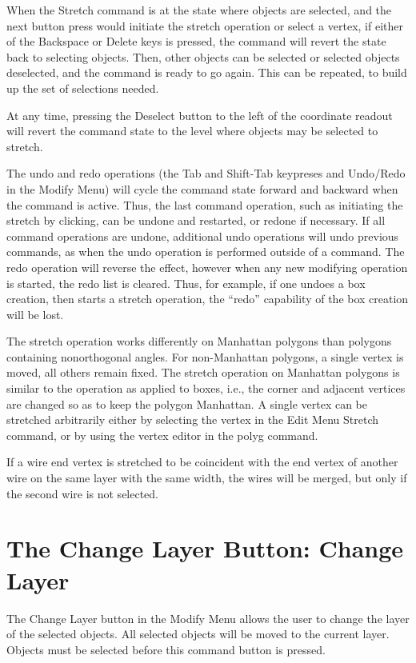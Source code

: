 When the {\cb Stretch} command is at the state where objects are
selected, and the next button press would initiate the stretch
operation or select a vertex, if either of the {\kb Backspace} or {\kb
Delete} keys is pressed, the command will revert the state back to
selecting objects.  Then, other objects can be selected or selected
objects deselected, and the command is ready to go again.  This can be
repeated, to build up the set of selections needed. 

At any time, pressing the {\cb Deselect} button to the left of the
coordinate readout will revert the command state to the level where
objects may be selected to stretch.

The undo and redo operations (the {\kb Tab} and {\kb Shift-Tab}
keypreses and {\cb Undo}/{\cb Redo} in the {\cb Modify Menu}) will
cycle the command state forward and backward when the command is
active.  Thus, the last command operation, such as initiating the
stretch by clicking, can be undone and restarted, or redone if
necessary.  If all command operations are undone, additional undo
operations will undo previous commands, as when the undo operation is
performed outside of a command.  The redo operation will reverse the
effect, however when any new modifying operation is started, the redo
list is cleared.  Thus, for example, if one undoes a box creation,
then starts a stretch operation, the ``redo'' capability of the box
creation will be lost.

The stretch operation works differently on Manhattan polygons than
polygons containing nonorthogonal angles.  For non-Manhattan polygons,
a single vertex is moved, all others remain fixed.  The stretch
operation on Manhattan polygons is similar to the operation as applied
to boxes, i.e., the corner and adjacent vertices are changed so as to
keep the polygon Manhattan.  A single vertex can be stretched
arbitrarily either by selecting the vertex in the {\cb Edit Menu} {\cb
Stretch} command, or by using the vertex editor in the {\cb polyg}
command.

If a wire end vertex is stretched to be coincident with the end vertex
of another wire on the same layer with the same width, the wires will
be merged, but only if the second wire is not selected.


\section{The {\cb Change Layer} Button: Change Layer}
The {\cb Change Layer} button in the {\cb Modify Menu} allows the user to
change the layer of the selected objects.  All selected objects will
be moved to the current layer.  Objects must be selected before this
command button is pressed.



